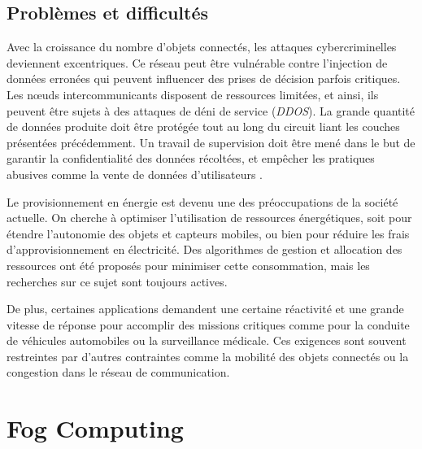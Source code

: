 \subsection{Problèmes et difficultés}
Avec la croissance du nombre d'objets connectés, les attaques cybercriminelles deviennent excentriques. Ce réseau peut être vulnérable contre l'injection de données erronées qui peuvent influencer des prises de décision parfois critiques. Les nœuds intercommunicants disposent de ressources limitées, et ainsi, ils peuvent être sujets à des attaques de déni de service (\emph{DDOS}). La grande quantité de données produite doit être protégée tout au long du circuit liant les couches présentées précédemment. Un travail de supervision doit être mené dans le but de garantir la confidentialité des données récoltées, et empêcher les pratiques abusives comme la vente de données d'utilisateurs \cite{COLAKOVIC201817}.\par
Le provisionnement en énergie est devenu une des préoccupations de la société actuelle. On cherche à optimiser l'utilisation de ressources énergétiques, soit pour étendre l'autonomie des objets et capteurs mobiles, ou bien pour réduire les frais d'approvisionnement en électricité. Des algorithmes de gestion et allocation des ressources ont été proposés pour minimiser cette consommation, mais les recherches sur ce sujet sont toujours actives.\par
De plus, certaines applications demandent une certaine réactivité et une grande vitesse de réponse pour accomplir des missions critiques comme pour la conduite de véhicules automobiles ou la surveillance médicale. Ces exigences sont souvent restreintes par d'autres contraintes comme la mobilité des objets connectés ou la congestion dans le réseau de communication.
\section{Fog Computing}


